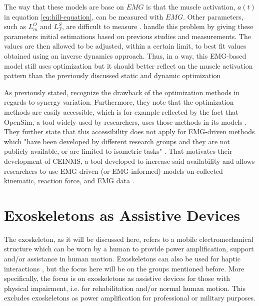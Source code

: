 The way that these models are base on $EMG$ is that the muscle activation, $a(t)$ in equation \ref{eq:hill-equation}, can be measured with $EMG$.
Other parameters, such as $L^O_m$ and $L^S_T$, are difficult to measure \cite{Winby2008}.
\textcite{Lloyd2003} handle this problem by giving these parameters initial estimations based on previous studies and measurements. The values are then allowed to be adjusted, within a certain limit, to best fit values obtained using an inverse dynamics approach.
Thus, in a way, this \ac{EMG}-based model still uses optimization but it should better reflect on the muscle activation pattern than the previously discussed static and dynamic optimization \cite{Pizzolato2015, Lloyd2003}

As previously stated, \textcite{Pizzolato2015} recognize the drawback of the optimization methods in regards to synergy variation. 
Furthermore, they note that the optimization methods are easily accessible, which is for example reflected by the fact that OpenSim, a tool widely used by researchers, uses those methods in its models \cite{Pizzolato2015, Delp2007, Seth2018}. 
They further state that this accessibility does not apply for EMG-driven methods which "have been developed by different research groups and they are not publicly available, or are limited to isometric tasks" \parencite[1]{Pizzolato2015}.
That motivates their development of \ac{CEINMS}, a tool developed to increase said availability and allows researchers to use \ac{EMG}-driven (or \ac{EMG}-informed) models on collected kinematic, reaction force, and \ac{EMG} data \cite{Pizzolato2015}.

\section{Exoskeletons as Assistive Devices}
\label{sec:A-Exoskeletons}
The exoskeleton, as it will be discussed here, refers to a mobile electromechanical structure which can be worn by a human to provide power amplification, support and/or assistance in human motion. Exoskeletons can also be used for haptic interactions \cite{Anam2012}, but the focus here will be on the groups mentioned before. More specifically, the focus is on exoskeletons as assistive devices for those with physical impairment, i.e. for rehabilitation and/or normal human motion. This excludes exoskeletons as power amplification for professional or military purposes.

